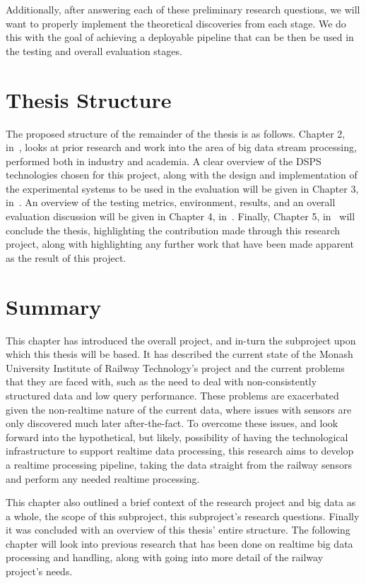 Additionally, after answering each of these preliminary research questions, we will want to properly implement the
theoretical discoveries from each stage. We do this with the goal of achieving a deployable pipeline that can be then
be used in the testing and overall evaluation stages.



\section{Thesis Structure} %
\label{sub:proposed_thesis_chapter_headings}

The proposed structure of the remainder of the thesis is as follows. Chapter 2, in~, looks at prior
research and work into the area of big data stream processing, performed both in industry and academia.
A clear overview of the DSPS technologies chosen for this project, along with the design and implementation
of the experimental systems to be used in the evaluation will be given in Chapter 3, in~.
An overview of the testing metrics, environment, results, and an overall evaluation discussion will be given in Chapter 4, in~.
Finally, Chapter 5, in~ will conclude the thesis, highlighting the contribution made through this research project,
along with highlighting any further work that have been made apparent as the result of this project.



\section{Summary} %
\label{sec:summary}

This chapter has introduced the overall project, and in-turn the subproject upon which this thesis will be based. It
has described the current state of the Monash University Institute of Railway Technology's project and the current
problems that they are faced with, such as the need to deal with non-consistently structured data and low query
performance. These problems are exacerbated given the non-realtime nature of the current data, where issues with sensors
are only discovered much later after-the-fact. To overcome these issues, and look forward into the hypothetical,
but likely, possibility of having the technological infrastructure to support realtime data processing, this research
aims to develop a realtime processing pipeline, taking the data straight from the railway sensors and perform any
needed realtime processing.

This chapter also outlined a brief context of the research project and big data as a whole, the scope of this subproject,
this subproject's research questions. Finally it was concluded with an overview of this thesis' entire structure. The
following chapter will look into previous research that has been done on realtime big data processing and handling,
along with going into more detail of the railway project's needs.


